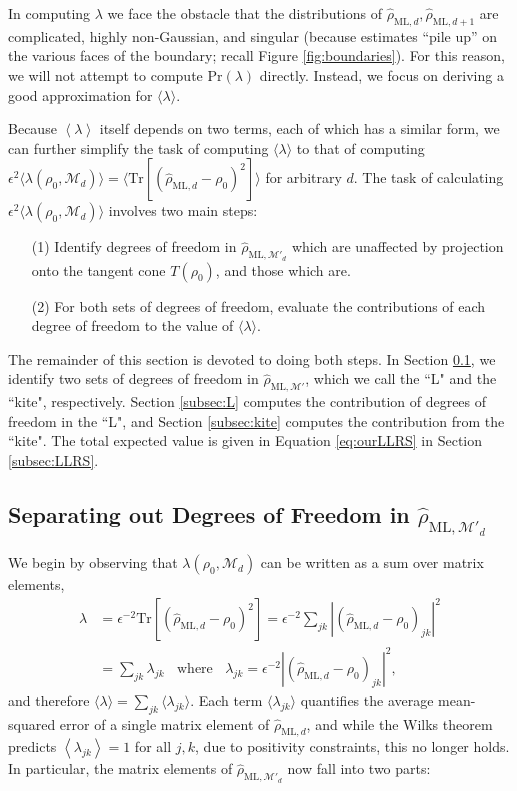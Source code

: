 \documentclass[aps,pra, twocolumn]{revtex4-1}
\newcommand{\M}{\mathcal{M}}
\newcommand{\expect}[1]{\ensuremath{\left\langle#1\right\rangle}}
\newcommand{\rhohat}{\hat{\rho}}
\newcommand{\rhoML}[1]{\rhohat_{\scriptscriptstyle{\mathrm{ML},#1}}}
\begin{document}
In computing $\lambda$ we face the obstacle that the distributions of $\rhoML{d}, \rhoML{d+1}$ are complicated, highly non-Gaussian, and singular (because estimates ``pile up'' on the various faces of the boundary; recall Figure \ref{fig:boundaries}).  For this reason, we will not attempt to compute $\mathrm{Pr}(\lambda)$ directly.  Instead, we focus on deriving a good approximation for $\langle \lambda \rangle$.

Because $\expect{\lambda}$ itself depends on two terms, each of which has a similar form, we can further simplify the task of computing $\langle \lambda \rangle$ to that of computing $\epsilon^{2}\langle \lambda(\rho_{0}, \M_{d}) \rangle = \langle \mathrm{Tr}[(\rhoML{d}  - \rho_{0})^{2}] \rangle$ for arbitrary $d$.
The task of calculating $\epsilon^{2}\langle \lambda(\rho_{0}, \M_{d})\rangle$ involves two main steps:
\begin{itemize}
\item[(1)] Identify degrees of freedom in $\rhoML{\M'_{d}}$ which are unaffected by projection onto the tangent cone $T(\rho_{0})$, and those which are.
\item[(2)] For both sets of degrees of freedom, evaluate the contributions of each degree of freedom to the value of $\langle \lambda \rangle$.
\end{itemize}

The remainder of this section is devoted to doing both steps. In Section \ref{subsec:dof}, we identify two sets of degrees of freedom in $\rhoML{\M'}$, which we call the ``L" and the ``kite", respectively. Section \ref{subsec:L} computes the contribution of degrees of freedom in the ``L", and Section \ref{subsec:kite} computes the contribution from the ``kite". The total expected value is given in Equation \eqref{eq:ourLLRS} in Section \ref{subsec:LLRS}.

\subsection{Separating out Degrees of Freedom in $\rhoML{\M'_{d}}$}
\label{subsec:dof}
We begin by observing that $\lambda(\rho_{0}, \M_{d})$ can be written as a sum over matrix elements,
\begin{align}
\label{eq:llrserrors}
\nonumber \lambda &=\epsilon^{-2}\mathrm{Tr}[(\rhoML{d} - \rho_{0})^{2}] = \epsilon^{-2}\sum_{jk}|(\rhoML{d}- \rho_{0} )_{jk}|^{2}\\
&= \sum_{jk}\lambda_{jk}~~~~\text{where}~~~~\lambda_{jk} = \epsilon^{-2}|(\rhoML{d} - \rho_{0} )_{jk} |^{2},
\end{align}
and therefore $\langle \lambda \rangle = \sum_{jk}\langle\lambda_{jk}\rangle$.  Each term $\langle \lambda_{jk}\rangle$ quantifies the average mean-squared error of a single matrix element of $\rhoML{d}$, and while the Wilks theorem predicts $\expect{\lambda_{jk}}=1$ for all $j,k$, due to positivity constraints, this no longer holds. In particular, the matrix elements of $\rhoML{\M'_{d}}$ now fall into two parts:
\end{document}
